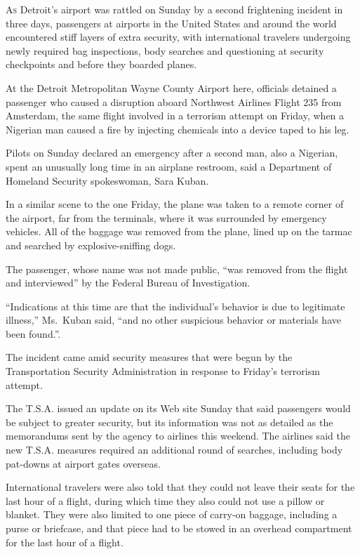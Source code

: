 ﻿\documentclass[12pt]{article}
\begin{document}
\lettrine{A}{s} Detroit's airport was rattled on Sunday by a second
frightening incident in three days, passengers at airports in the United States and around the world
encountered stiff layers of extra security, with international travelers undergoing newly required
bag inspections, body searches and questioning at security checkpoints and before they boarded
planes.

At the Detroit Metropolitan Wayne County Airport here, officials detained a passenger who caused a
disruption aboard Northwest Airlines Flight 235 from Amsterdam, the same flight involved in a
terrorism attempt on Friday, when a Nigerian man caused a fire by injecting chemicals into a device
taped to his leg.

Pilots on Sunday declared an emergency after a second man, also a Nigerian, spent an unusually long
time in an airplane restroom, said a Department of Homeland Security spokeswoman, Sara Kuban.

In a similar scene to the one Friday, the plane was taken to a remote corner of the airport, far
from the terminals, where it was surrounded by emergency vehicles. All of the baggage was removed
from the plane, lined up on the tarmac and searched by explosive-sniffing dogs.

The passenger, whose name was not made public, ``was removed from the flight and interviewed'' by
the Federal Bureau of Investigation.

``Indications at this time are that the individual's behavior is due to legitimate illness,''
Ms.~Kuban said, ``and no other suspicious behavior or materials have been found.''.

The incident came amid security measures that were begun by the Transportation Security
Administration in response to Friday's terrorism attempt.

The T.S.A. issued an update on its Web site Sunday that said passengers would be subject to greater
security, but its information was not as detailed as the memorandums sent by the agency to airlines
this weekend. The airlines said the new T.S.A. measures required an additional round of searches,
including body pat-downs at airport gates overseas.

International travelers were also told that they could not leave their seats for the last hour of a
flight, during which time they also could not use a pillow or blanket. They were also limited to one
piece of carry-on baggage, including a purse or briefcase, and that piece had to be stowed in an
overhead compartment for the last hour of a flight.
\end{document}
